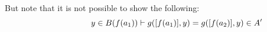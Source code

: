 \noindent
				But note that it is not possible to show the following:
				\begin{equation}
				\hspace{2cm}y \in B(f(a_1)) \vdash g([f(a_1)], y) = g([f(a_2)], y) \in A'\label{ex3-equality}
				\end{equation}
			
